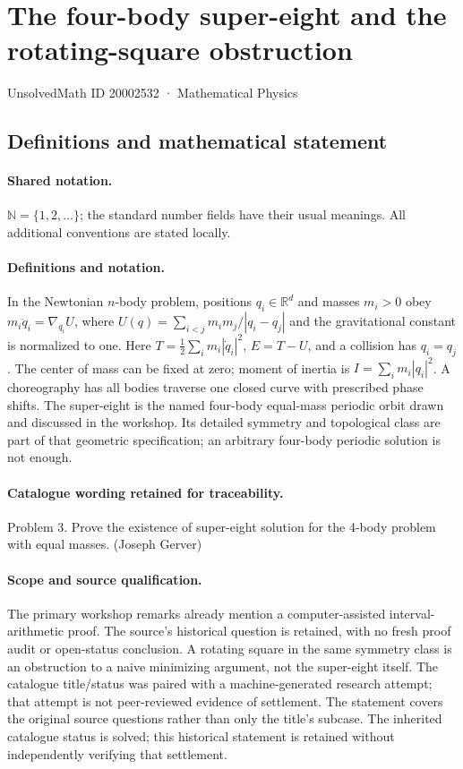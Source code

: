 \documentclass[11pt]{article}
\begin{document}
\setcounter{section}{20002531}
\section{The four-body super-eight and the rotating-square obstruction}\label{20002532}
{\small UnsolvedMath ID 20002532 · Mathematical Physics}
\subsection{Definitions and mathematical statement}

\paragraph{Shared notation.}$\mathbb N=\{1,2,\ldots\}$; the standard number fields have their usual meanings. All additional conventions are stated locally.


\paragraph{Definitions and notation.}In the Newtonian $n$-body problem, positions $q_i\in\mathbb R^d$ and masses $m_i>0$ obey $m_i\ddot q_i=\nabla_{q_i}U$, where $U(q)=\sum_{i<j}m_im_j/|q_i-q_j|$ and the gravitational constant is normalized to one. Here $T=\tfrac12\sum_i m_i|\dot q_i|^2$, $E=T-U$, and a collision has $q_i=q_j$. The center of mass can be fixed at zero; moment of inertia is $I=\sum_i m_i|q_i|^2$. A choreography has all bodies traverse one closed curve with prescribed phase shifts. The super-eight is the named four-body equal-mass periodic orbit drawn and discussed in the workshop. Its detailed symmetry and topological class are part of that geometric specification; an arbitrary four-body periodic solution is not enough.

\paragraph{Catalogue wording retained for traceability.}
Problem 3. Prove the existence of super-eight solution for the 4-body problem with equal masses. (Joseph Gerver)
\paragraph{Scope and source qualification.}The primary workshop remarks already mention a computer-assisted interval-arithmetic proof. The source’s historical question is retained, with no fresh proof audit or open-status conclusion. A rotating square in the same symmetry class is an obstruction to a naive minimizing argument, not the super-eight itself. The catalogue title/status was paired with a machine-generated research attempt; that attempt is not peer-reviewed evidence of settlement. The statement covers the original source questions rather than only the title’s subcase. The inherited catalogue status is solved; this historical statement is retained without independently verifying that settlement.
\end{document}
